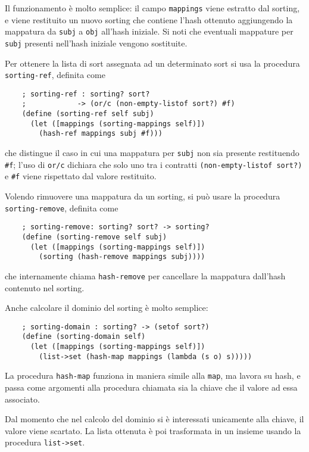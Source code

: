 Il funzionamento \`e molto semplice: il campo \lstinline{mappings}
viene estratto dal sorting, e viene restituito un nuovo sorting che
contiene l'hash ottenuto aggiungendo la mappatura da \lstinline{subj} a
\lstinline{obj} all'hash iniziale. Si noti che eventuali mappature per
\lstinline{subj} presenti nell'hash iniziale vengono sostituite.

Per ottenere la lista di sort assegnata ad un determinato sort si
usa la procedura \lstinline{sorting-ref}, definita come

\begin{lstlisting}
    ; sorting-ref : sorting? sort?
    ;            -> (or/c (non-empty-listof sort?) #f)
    (define (sorting-ref self subj)
      (let ([mappings (sorting-mappings self)])
        (hash-ref mappings subj #f)))
\end{lstlisting}

che distingue il caso in cui una mappatura per \lstinline{subj} non sia
presente restituendo \lstinline{#f}; l'uso di \lstinline{or/c} dichiara
che solo uno tra i contratti \lstinline{(non-empty-listof sort?)} e
\lstinline{#f} viene rispettato dal valore restituito.

Volendo rimuovere una mappatura da un sorting, si pu\`o usare la
procedura \lstinline{sorting-remove}, definita come

\begin{lstlisting}
    ; sorting-remove: sorting? sort? -> sorting?
    (define (sorting-remove self subj)
      (let ([mappings (sorting-mappings self)])
        (sorting (hash-remove mappings subj))))
\end{lstlisting}

che internamente chiama \lstinline{hash-remove} per cancellare la
mappatura dall'hash contenuto nel sorting.

Anche calcolare il dominio del sorting \`e molto semplice:

\begin{lstlisting}
    ; sorting-domain : sorting? -> (setof sort?)
    (define (sorting-domain self)
      (let ([mappings (sorting-mappings self)])
        (list->set (hash-map mappings (lambda (s o) s)))))
\end{lstlisting}

La procedura \lstinline{hash-map} funziona in maniera simile alla
\lstinline{map}, ma lavora su hash, e passa come argomenti alla
procedura chiamata sia la chiave che il valore ad essa associato.

Dal momento che nel calcolo del dominio si \`e interessati unicamente
alla chiave, il valore viene scartato. La lista ottenuta \`e poi
trasformata in un insieme usando la procedura \lstinline{list->set}.

